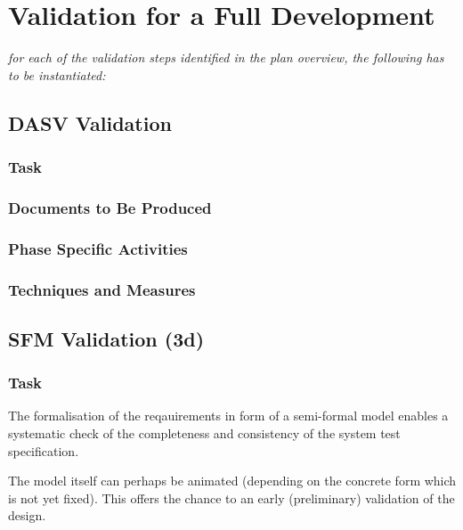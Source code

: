 \documentclass{template/openetcs_report}
\begin{document}
\section{Validation for a Full Development}
\label{sec:valid-full-devel}

\textit{for each of the validation steps identified in the plan
  overview, the following has to be instantiated: }
\subsection{DASV Validation}
\label{sec:dasv-validation}

\subsubsection{Task}
\label{sec:dasv-valid-task}


\subsubsection{Documents to Be Produced}
\label{sec:dasv-valid-docum-be-prod}


\subsubsection{Phase Specific Activities}
\label{sec:dasv-valid-phase-spec-activ}

\subsubsection{Techniques and Measures}
\label{sec:dasv-valid-techniques-measures}



\subsection{SFM Validation (3d)}
\label{sec:sfm-validation}

\subsubsection{Task}
\label{sec:sfm-valid-task}

The formalisation of the reqauirements in form of a semi-formal model
enables a systematic check of the completeness and consistency of the
system test specification.

The model itself can perhaps be animated (depending on the concrete
form which is not yet fixed). This offers the chance to an early
(preliminary) validation of the design.
\end{document}
